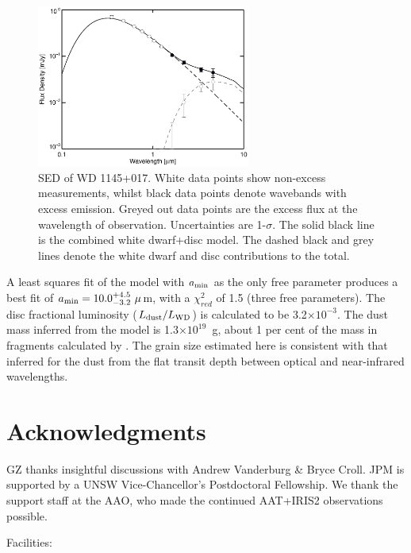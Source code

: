\documentclass[apj]{emulateapj}
\begin{document}
\begin{figure}
    \centering
    \includegraphics[width=7cm]{plots/wd1145p017_sed_astrosil.eps}
    \caption{SED of WD 1145+017. White data points show non-excess measurements, whilst black data points denote wavebands with excess emission. Greyed out data points are the excess flux at the wavelength of observation. Uncertainties are 1-$\sigma$. The solid black line is the combined white dwarf+disc model. The dashed black and grey lines denote the white dwarf and disc contributions to the total. \label{fig:wd1145p017_sed}}
\end{figure}

A least squares fit of the model with $a_{\rm min}$ as the only free parameter produces a best fit of $a_{\rm min} = 10.0^{+4.5}_{-3.2}~\mu$m, with a $\chi^{2}_{red}$ of 1.5 (three free parameters). The disc fractional luminosity ($L_{\rm dust}/L_{\rm WD}$) is calculated to be 3.2$\times10^{-3}$. The dust mass inferred from the model is 1.3$\times10^{19}$~g, about 1 per cent of the mass in fragments calculated by \cite{2015Natur.526..546V}. The grain size estimated here is consistent with that inferred for the dust from the flat transit depth between optical and near-infrared wavelengths. 


\section{Acknowledgments}
GZ thanks insightful discussions with Andrew Vanderburg \& Bryce Croll. JPM is supported by a UNSW Vice-Chancellor's Postdoctoral Fellowship. We thank the support staff at the AAO, who made the continued AAT+IRIS2 observations possible. 

Facilities: 



\end{document}
